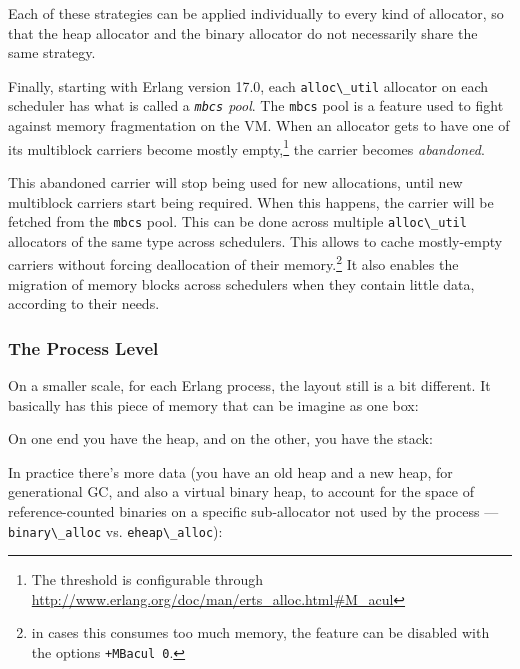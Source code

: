\documentclass[11pt, oneside]{book}   	%
\newcommand{\term}[1]{\Verb`#1`}
\begin{document}
Each of these strategies can be applied individually to every kind of allocator, so that the heap allocator and the binary allocator do not necessarily share the same strategy.

Finally, starting with Erlang version 17.0, each \term{alloc\_util} allocator on each scheduler has what is called a \emph{\term{mbcs} pool}. The \term{mbcs} pool is a feature used to fight against memory fragmentation on the VM. When an allocator gets to have one of its multiblock carriers become mostly empty,\footnote{The threshold is configurable through \href{http://www.erlang.org/doc/man/erts\_alloc.html\#M\_acul}{http://www.erlang.org/doc/man/erts\_alloc.html\#M\_acul}} the carrier becomes \emph{abandoned}. 

This abandoned carrier will stop being used for new allocations, until new multiblock carriers start being required. When this happens, the carrier will be fetched from the \term{mbcs} pool. This can be done across multiple \term{alloc\_util} allocators of the same type across schedulers. This allows to cache mostly-empty carriers without forcing deallocation of their memory.\footnote{in cases this consumes too much memory, the feature can be disabled with the options \term{+MBacul 0}.} It also enables the migration of memory blocks across schedulers when they contain little data, according to their needs.

\subsubsection{The Process Level}

On a smaller scale, for each Erlang process, the layout still is a bit different. It basically has this piece of memory that can be imagine as one box:

\begin{VerbatimText}
[                  ]
\end{VerbatimText}

On one end you have the heap, and on the other, you have the stack:

\begin{VerbatimText}
\end{VerbatimText}

In practice there's more data (you have an old heap and a new heap, for generational GC, and also a virtual binary heap, to account for the space of reference-counted binaries on a specific sub-allocator not used by the process — \term{binary\_alloc} vs. \term{eheap\_alloc}):
\end{document}
